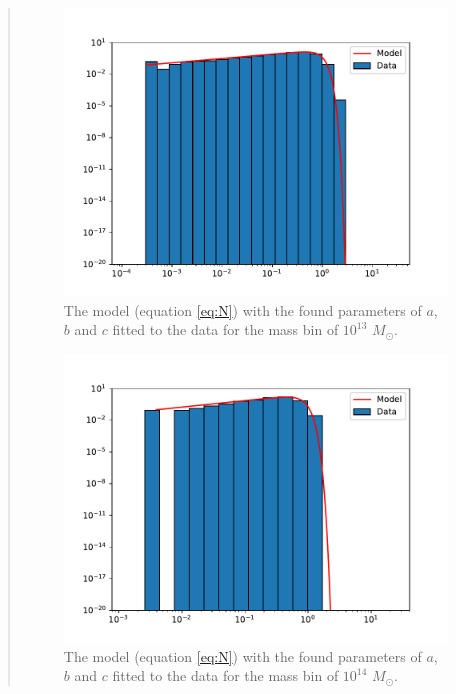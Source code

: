 \begin{quote}
\begin{figure}[!hb]
\end{figure}

\begin{figure}[!ht]
\centering
\includegraphics[scale=0.7]{plots/satgals_m13.pdf}
\caption{The model (equation \ref{eq:N}) with the found parameters of $a$, $b$ and $c$ fitted to the data for the mass bin of $10^{13}$ $M_{\odot}$.}
\end{figure}
\begin{figure}[!hb]
\centering
\includegraphics[scale=0.7]{plots/satgals_m14.pdf}
\caption{The model (equation \ref{eq:N}) with the found parameters of $a$, $b$ and $c$ fitted to the data for the mass bin of $10^{14}$ $M_{\odot}$.}
\end{figure}



\end{quote}
